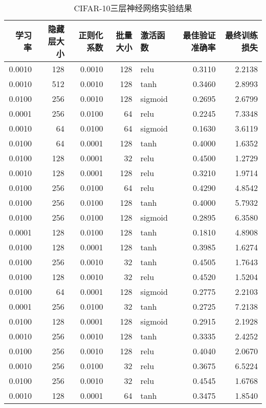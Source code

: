 \usepackage{multirow}

\begin{table}
\caption{CIFAR-10三层神经网络实验结果}
\label{tab:cifar10_results}
\begin{tabular}{rrrrlrr}
\toprule
学习率 & 隐藏层大小 & 正则化系数 & 批量大小 & 激活函数 & 最佳验证准确率 & 最终训练损失 \\
\midrule
0.0010 & 128 & 0.0010 & 128 & relu & 0.3110 & 2.2138 \\
0.0010 & 512 & 0.0010 & 128 & tanh & 0.3460 & 2.8993 \\
0.0100 & 256 & 0.0010 & 128 & sigmoid & 0.2695 & 2.6799 \\
0.0001 & 256 & 0.0100 & 64 & relu & 0.2245 & 7.3348 \\
0.0010 & 64 & 0.0100 & 64 & sigmoid & 0.1630 & 3.6119 \\
0.0100 & 64 & 0.0001 & 128 & tanh & 0.4000 & 1.6352 \\
0.0100 & 128 & 0.0001 & 32 & relu & 0.4500 & 1.2729 \\
0.0010 & 128 & 0.0001 & 128 & relu & 0.3210 & 1.9714 \\
0.0100 & 256 & 0.0100 & 64 & relu & 0.4290 & 4.8542 \\
0.0100 & 256 & 0.0100 & 128 & tanh & 0.4000 & 5.7932 \\
0.0100 & 256 & 0.0100 & 128 & sigmoid & 0.2895 & 6.3580 \\
0.0001 & 128 & 0.0100 & 128 & tanh & 0.1810 & 4.8908 \\
0.0100 & 128 & 0.0001 & 128 & tanh & 0.3985 & 1.6274 \\
0.0100 & 256 & 0.0010 & 32 & tanh & 0.4505 & 1.7643 \\
0.0100 & 128 & 0.0010 & 32 & relu & 0.4520 & 1.5204 \\
0.0100 & 64 & 0.0001 & 128 & sigmoid & 0.2775 & 2.2103 \\
0.0001 & 256 & 0.0100 & 32 & tanh & 0.2725 & 7.2138 \\
0.0100 & 128 & 0.0001 & 128 & sigmoid & 0.2915 & 2.1928 \\
0.0010 & 256 & 0.0010 & 128 & tanh & 0.3335 & 2.4252 \\
0.0100 & 256 & 0.0010 & 128 & relu & 0.4040 & 2.0670 \\
0.0010 & 256 & 0.0100 & 32 & relu & 0.3675 & 6.5224 \\
0.0100 & 256 & 0.0010 & 32 & relu & 0.4545 & 1.6768 \\
0.0010 & 128 & 0.0001 & 64 & tanh & 0.3475 & 1.8540 \\

\end{tabular}
\end{table}
